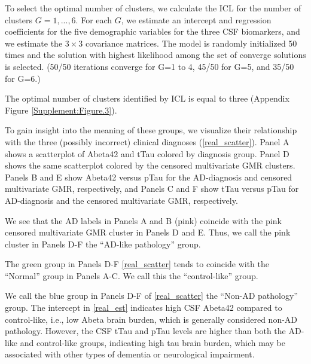 \documentclass{interact}
\theoremstyle{plain}
\theoremstyle{definition}
\theoremstyle{remark}
\begin{document}
To select the optimal number of clusters, we calculate the ICL for the number of clusters $G=1,...,6$. For each $G$, we estimate an intercept and regression coefficients for the five demographic variables for the three CSF biomarkers, and we estimate the $3\times3$ covariance matrices. The model is randomly initialized 50 times and the solution with highest likelihood among the set of converge solutions is selected. (50/50 iterations converge for G=1 to 4, 45/50 for G=5, and 35/50 for G=6.)

The optimal number of clusters identified by ICL is equal to three (Appendix Figure \ref{Supplement:Figure.3}). 

To gain insight into the meaning of these groups, we visualize their relationship with the three (possibly incorrect) clinical diagnoses (\cref{real_scatter}). Panel A shows a scatterplot of Abeta42 and tTau colored by diagnosis group. Panel D shows the same scatterplot colored by the censored multivariate GMR clusters. Panels B and E show Abeta42 versus pTau for the AD-diagnosis and censored multivariate GMR, respectively, and Panels C and F show tTau versus pTau for AD-diagnosis and the censored multivariate GMR, respectively. 

We see that the AD labels in Panels A and B (pink) coincide with the pink censored multivariate GMR cluster in Panels D and E. Thus, we call the pink cluster in Panels D-F the ``AD-like pathology'' group.

The green group in Panels D-F \cref{real_scatter} tends to coincide with the ``Normal'' group in Panels A-C. 
We call this the ``control-like'' group. 

We call the blue group in Panels D-F of \cref{real_scatter} the ``Non-AD pathology'' group. The intercept in  \cref{real_est} indicates high CSF Abeta42 compared to control-like, i.e., low Abeta brain burden, which is generally considered non-AD pathology. However, the CSF tTau and pTau levels are higher than both the AD-like and control-like groups, indicating high tau brain burden, which may be associated with other types of dementia or neurological impairment. 
\end{document}
